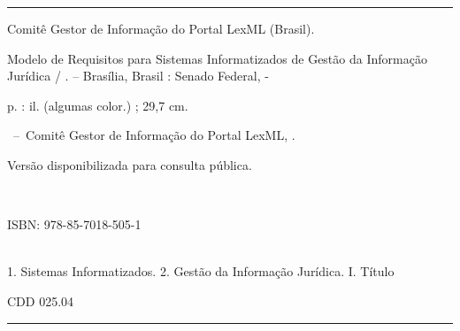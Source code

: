 \documentclass[a4paper,11pt,openright,twoside,english,brazil]{abntex2}
\begin{document}

\begin{fichacatalografica}\ABNTEXchapterfont
\vspace*{\fill} %
\hrule %
\begin{center} %
\begin{minipage}[c]{13cm} %
Comitê Gestor de Informação do Portal LexML (Brasil). \imprimirautor

\hspace{0.5cm} Modelo de Requisitos para Sistemas Informatizados de Gestão 
da Informação Jurídica / \imprimirautor. --
Brasília, Brasil : Senado Federal, \imprimirdata-

\hspace{0.5cm} \pageref{LastPage} p. : il. (algumas color.) ; 29,7 cm.\\

\hspace{0.5cm}
\parbox[t]{\textwidth}{\imprimirtipotrabalho~--~Comitê Gestor de Informação do 
Portal LexML, \imprimirdata.}

\hspace{0.5cm}
\parbox[t]{\textwidth}{Versão disponibilizada para consulta pública.}\\

\hspace{0.5cm}
\parbox[t]{\textwidth}{ISBN: 978-85-7018-505-1}\\

\hspace{0.5cm}
1. Sistemas Informatizados.
2. Gestão da Informação Jurídica.
I. Título
\begin{flushright}
 CDD 025.04
\end{flushright}
\end{minipage}
\end{center}
\hrule
\end{fichacatalografica}

\cleardoublepage


\listoffigures*
\cleardoublepage

\listoftables*
\cleardoublepage
\end{document}
